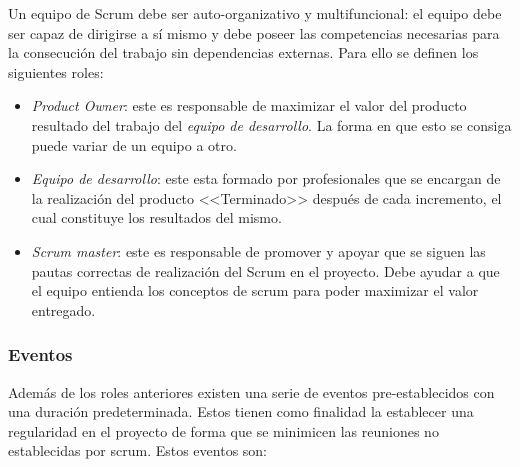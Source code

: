 Un equipo de Scrum debe ser auto-organizativo y multifuncional: el equipo debe ser capaz de dirigirse a sí mismo y debe poseer las competencias necesarias para la consecución del trabajo sin dependencias externas. Para ello se definen los siguientes roles:

\begin{itemize}
    \item \textit{Product Owner}: este es responsable de maximizar el valor del producto resultado del trabajo del \textit{equipo de desarrollo}. La forma en que esto se consiga puede variar de un equipo a otro.
    
    \item \textit{Equipo de desarrollo}: este esta formado por profesionales que se encargan de la realización del producto <<Terminado>> después de cada incremento, el cual constituye los resultados del mismo.
    
    \item \textit{Scrum master}: este es responsable de promover y apoyar que se siguen las pautas correctas de realización del Scrum en el proyecto. Debe ayudar a que el equipo entienda los conceptos de scrum para poder maximizar el valor entregado.
    
\end{itemize}

\subsubsection{Eventos}

Además de los roles anteriores existen una serie de eventos pre-establecidos con una duración predeterminada. Estos tienen como finalidad la establecer una regularidad en el proyecto de forma que se minimicen las reuniones no establecidas por scrum. Estos eventos son:

